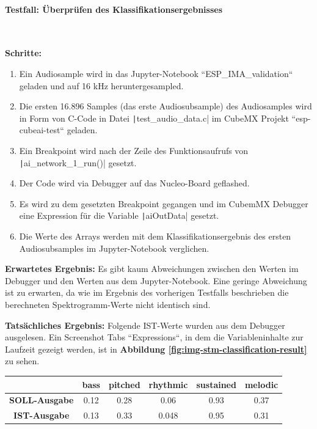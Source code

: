 \paragraph{Testfall: Überprüfen des Klassifikationsergebnisses}\mbox{}\\
\begin{adjustwidth}{0.5cm}{0cm}
\textbf{Schritte:}
\begin{enumerate}
	\item Ein Audiosample wird in das Jupyter-Notebook ``ESP\_IMA\_validation`` geladen und auf 16 kHz heruntergesampled.
	\item Die ersten 16.896 Samples (das erste Audiosubsample) des Audiosamples wird in Form von C-Code in Datei \texttt|test_audio_data.c| im CubeMX Projekt ``esp-cubeai-test`` geladen.
	\item Ein Breakpoint wird nach der Zeile des Funktionsaufrufs von \texttt|ai_network_1_run()| gesetzt.
	\item Der Code wird via Debugger auf das Nucleo-Board geflashed.
	\item Es wird zu dem gesetzten Breakpoint gegangen und im CubemMX Debugger eine Expression für die Variable \texttt|aiOutData| gesetzt.
	\item Die Werte des Arrays werden mit dem Klassifikationsergebnis des ersten Audiosubsamples im Jupyter-Notebook verglichen.
\end{enumerate}

\textbf{Erwartetes Ergebnis:} Es gibt kaum Abweichungen zwischen den Werten im Debugger und den Werten aus dem Jupyter-Notebook. Eine geringe Abweichung ist zu erwarten, da wie im Ergebnis des vorherigen Testfalls beschrieben die berechneten Spektrogramm-Werte nicht identisch sind.


\textbf{Tatsächliches Ergebnis:}
Folgende IST-Werte wurden aus dem Debugger ausgelesen. Ein Screenshot Tabs ``Expressions``, in dem die Variableninhalte zur Laufzeit gezeigt werden, ist in \textbf{Abbildung \ref{fig:img-stm-classification-result}} zu sehen.

\begin{table}[h!]
\centering
\begin{tabular}{|c|c|c|c|c|c|}
    \hline
     & \textbf{bass} & \textbf{pitched} & \textbf{rhythmic} & \textbf{sustained} & \textbf{melodic} \\ \hline
    \textbf{SOLL-Ausgabe} & 0.12 & 0.28 & 0.06 & 0.93 & 0.37 \\ \hline
    \textbf{IST-Ausgabe }& 0.13 & 0.33 & 0.048 & 0.95 & 0.31 \\ \hline
\end{tabular}
\end{table}


\end{adjustwidth}
